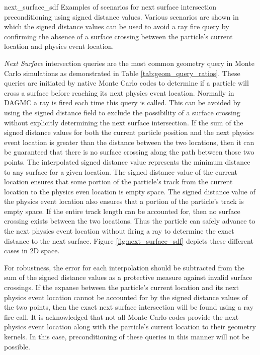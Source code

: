              {next_surface_sdf}
             {Examples of scenarios for next surface intersection
               preconditioning using signed distance values. Various scenarios
               are shown in which the signed distance values can be used to
               avoid a ray fire query by confirming the absence of a surface
               crossing between the particle's current location and physics
               event location. } {
               \textit{Next Surface} intersection queries are the most common
               geometry query in Monte Carlo simulations as demonstrated in
               Table \ref{tab:geom_query_ratios}. These queries are initiated by
               native Monte Carlo codes to determine if a particle will cross a
               surface before reaching its next physics event location. Normally
               in DAGMC a ray is fired each time this query is called. This can
               be avoided by using the signed distance field to exclude the
               possibility of a surface crossing without explicitly determining
               the next surface intersection. If the sum of the signed distance
               values for both the current particle position and the next
               physics event location is greater than the distance between the
               two locations, then it can be guaranteed that there is no surface
               crossing along the path between those two points. The
               interpolated signed distance value represents the minimum
               distance to any surface for a given location. The signed distance
               value of the current location ensures that some portion of the
               particle's track from the current location to the physics even
               location is empty space. The signed distance value of the physics
               event location also ensures that a portion of the particle's
               track is empty space. If the entire track length can be accounted
               for, then no surface crossing exists between the two
               locations. Thus the particle can safely advance to the next
               physics event location without firing a ray to determine the
               exact distance to the next surface. Figure
               \ref{fig:next_surface_sdf} depicts these different cases in 2D
               space.

               For robustness, the error for each interpolation should be
               subtracted from the sum of the signed distance values as a
               protective measure against invalid surface crossings. If the
               expanse between the particle's current location and its next
               physics event location cannot be accounted for by the signed
               distance values of the two points, then the exact next surface
               intersection will be found using a ray fire
               call. It is acknowledged that not all
               Monte Carlo codes provide the next physics event location along
               with the particle's current location to their geometry
               kernels. In this case, preconditioning of these queries in this
               manner will not be possible.
              }

